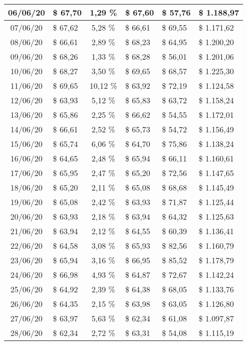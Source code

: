 \begin{center}
\begin{small}
\begin{longtable}{|c|l|c|l|l|l|}
06/06/20 & \$ 67,70 & 1,29 \% & \$ 67,60 & \$ 57,76 & \$ 1.188,97 \\ \hline
07/06/20 & \$ 67,62 & 5,28 \% & \$ 66,61 & \$ 69,55 & \$ 1.171,62 \\ \hline
08/06/20 & \$ 66,61 & 2,89 \% & \$ 68,23 & \$ 64,95 & \$ 1.200,20 \\ \hline
09/06/20 & \$ 68,26 & 1,33 \% & \$ 68,28 & \$ 56,01 & \$ 1.201,06 \\ \hline
10/06/20 & \$ 68,27 & 3,50 \% & \$ 69,65 & \$ 68,57 & \$ 1.225,30 \\ \hline
11/06/20 & \$ 69,65 & 10,12 \% & \$ 63,92 & \$ 72,19 & \$ 1.124,58 \\ \hline
12/06/20 & \$ 63,93 & 5,12 \% & \$ 65,83 & \$ 63,72 & \$ 1.158,24 \\ \hline
13/06/20 & \$ 65,86 & 2,25 \% & \$ 66,62 & \$ 54,55 & \$ 1.172,01 \\ \hline
14/06/20 & \$ 66,61 & 2,52 \% & \$ 65,73 & \$ 54,72 & \$ 1.156,49 \\ \hline
15/06/20 & \$ 65,74 & 6,06 \% & \$ 64,70 & \$ 75,86 & \$ 1.138,24 \\ \hline
16/06/20 & \$ 64,65 & 2,48 \% & \$ 65,94 & \$ 66,11 & \$ 1.160,61 \\ \hline
17/06/20 & \$ 65,95 & 2,47 \% & \$ 65,20 & \$ 72,56 & \$ 1.147,65 \\ \hline
18/06/20 & \$ 65,20 & 2,11 \% & \$ 65,08 & \$ 68,68 & \$ 1.145,49 \\ \hline
19/06/20 & \$ 65,08 & 2,42 \% & \$ 63,93 & \$ 71,87 & \$ 1.125,44 \\ \hline
20/06/20 & \$ 63,93 & 2,18 \% & \$ 63,94 & \$ 64,32 & \$ 1.125,63 \\ \hline
21/06/20 & \$ 63,94 & 2,12 \% & \$ 64,55 & \$ 60,39 & \$ 1.136,41 \\ \hline
22/06/20 & \$ 64,58 & 3,08 \% & \$ 65,93 & \$ 82,56 & \$ 1.160,79 \\ \hline
23/06/20 & \$ 65,94 & 3,16 \% & \$ 66,95 & \$ 85,52 & \$ 1.178,79 \\ \hline
24/06/20 & \$ 66,98 & 4,93 \% & \$ 64,87 & \$ 72,67 & \$ 1.142,24 \\ \hline
25/06/20 & \$ 64,92 & 2,39 \% & \$ 64,38 & \$ 68,05 & \$ 1.133,76 \\ \hline
26/06/20 & \$ 64,35 & 2,15 \% & \$ 63,98 & \$ 63,05 & \$ 1.126,80 \\ \hline
27/06/20 & \$ 63,97 & 5,63 \% & \$ 62,34 & \$ 61,08 & \$ 1.097,87 \\ \hline
28/06/20 & \$ 62,34 & 2,72 \% & \$ 63,31 & \$ 54,08 & \$ 1.115,19 \\ \hline

\end{longtable}
\end{small}
\end{center}
